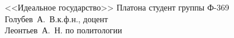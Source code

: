 


\usepackage{color}
\usepackage[colorlinks,linkcolor=black,filecolor=blue,citecolor=blue]{hyperref}
\renewcommand{\baselinestretch}{1.5}


    {<<Идеальное государство>> Платона}
    {студент группы Ф-369\\Голубев~А.~В.}{к.ф.н., доцент\\Леонтьев~А.~Н.}
    {по политологии}
        
    \tableofcontents
    \thispagestyle{empty}
    \newpage
    

